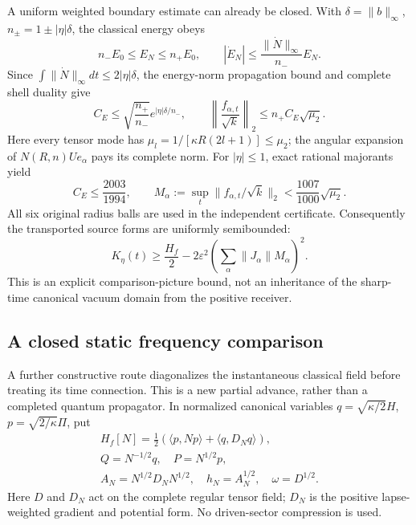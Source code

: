 A uniform weighted boundary estimate can already be closed. With
$\delta=\|b\|_\infty$, $n_\pm=1\pm|\eta|\delta$, the classical energy obeys
\[
 n_-E_0\le E_N\le n_+E_0,\qquad
 |\dot E_N|\le\frac{\|\dot N\|_\infty}{n_-}E_N.
\]
Since $\int\|\dot N\|_\infty dt\le2|\eta|\delta$, the energy-norm
propagation bound and complete shell duality give
\[
 C_E\le\sqrt{\frac{n_+}{n_-}}e^{|\eta|\delta/n_-},\qquad
 \left\|\frac{f_{\alpha,t}}{\sqrt k}\right\|_2
       \le n_+C_E\sqrt{\mu_2}.
\]
Here every tensor mode has $\mu_l=1/[\kappa R(2l+1)]\le\mu_2$; the
angular expansion of $N(R,n)Ue_\alpha$ pays its complete norm.
For $|\eta|\le1$, exact rational majorants yield
\[
 C_E\le\frac{2003}{1994},\qquad
 M_\alpha:=\sup_t\|f_{\alpha,t}/\sqrt k\|_2
       <\frac{1007}{1000}\sqrt{\mu_2}.
\]
All six original radius balls are used in the independent certificate.
Consequently the transported source forms are uniformly semibounded:
\[
 K_\eta(t)\ge\frac{H_f}{2}
       -2\varepsilon^2\left(\sum_\alpha\|J_\alpha\|M_\alpha\right)^2.
\]
This is an explicit comparison-picture bound, not an inheritance of the
sharp-time canonical vacuum domain from the positive receiver.

\subsection{A closed static frequency comparison}
A further constructive route diagonalizes the instantaneous classical field
before treating its time connection. This is a new partial advance, rather
than a completed quantum propagator. In normalized canonical variables
$q=\sqrt{\kappa/2}H$, $p=\sqrt{2/\kappa}\Pi$, put
\[
 \begin{gathered}
 H_f[N]=\tfrac12(\langle p,Np\rangle+\langle q,D_Nq\rangle),\\
 Q=N^{-1/2}q,\quad P=N^{1/2}p,\\
 A_N=N^{1/2}D_NN^{1/2},\quad h_N=A_N^{1/2},\quad \omega=D^{1/2}.
 \end{gathered}
\]
Here $D$ and $D_N$ act on the complete regular tensor field; $D_N$ is the
positive lapse-weighted gradient and potential form. No driven-sector
compression is used.

